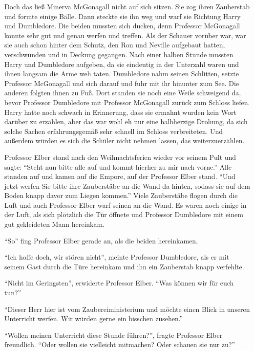 Doch das ließ Minerva McGonagall nicht auf sich sitzen. Sie zog ihren Zauberstab und formte einige Bälle. Dann steckte sie ihn weg und warf sie Richtung Harry und Dumbledore. Die beiden mussten sich ducken, denn Professor McGonagall konnte sehr gut und genau werfen und treffen. Als der Schauer vorüber war, war sie auch schon hinter dem Schutz, den Ron und Neville aufgebaut hatten, verschwunden und in Deckung gegangen. Nach einer halben Stunde mussten Harry und Dumbledore aufgeben, da sie eindeutig in der Unterzahl waren und ihnen langsam die Arme weh taten. Dumbledore nahm seinen Schlitten, setzte Professor McGonagall und sich darauf und fuhr mit ihr hinunter zum See. Die anderen folgten ihnen zu Fuß. Dort standen sie noch eine Weile schweigend da, bevor Professor Dumbledore mit Professor McGonagall zurück zum Schloss liefen. Harry hatte noch schwach in Erinnerung, dass sie ermahnt wurden kein Wort darüber zu erzählen, aber das war wohl eh nur eine halbherzige Drohung, da sich solche Sachen erfahrungsgemäß sehr schnell im Schloss verbreiteten. Und außerdem würden es sich die Schüler nicht nehmen lassen, das weiterzuerzählen.

\trenn

Professor Elber stand nach den Weihnachtsferien wieder vor seinem Pult und sagte: \enquote{Steht nun bitte alle auf und kommt hierher zu mir nach vorne.} Alle standen auf und kamen auf die Empore, auf der Professor Elber stand. \enquote{Und jetzt werfen Sie bitte ihre Zauberstäbe an die Wand da hinten, sodass sie auf dem Boden knapp davor zum Liegen kommen.} Viele Zauberstäbe flogen durch die Luft und auch Professor Elber warf seinen an die Wand. Es waren noch einige in der Luft, als sich plötzlich die Tür öffnete und Professor Dumbledore mit einem gut gekleideten Mann hereinkam.

\enquote{So\abs} fing Professor Elber gerade an, als die beiden hereinkamen.

\enquote{Ich hoffe doch, wir stören nicht}, meinte Professor Dumbledore, als er mit seinem Gast durch die Türe hereinkam und ihn ein Zauberstab knapp verfehlte.

\enquote{Nicht im Geringsten}, erwiderte Professor Elber. \enquote{Was können wir für euch tun?}

\enquote{Dieser Herr hier ist vom Zaubereiministerium und möchte einen Blick in unseren Unterricht werfen. Wir würden gerne ein bisschen zusehen.}

\enquote{Wollen  meinen Unterricht diese Stunde führen?}, fragte Professor Elber freundlich. \enquote{Oder wollen sie vielleicht mitmachen? Oder schauen sie nur zu?}

